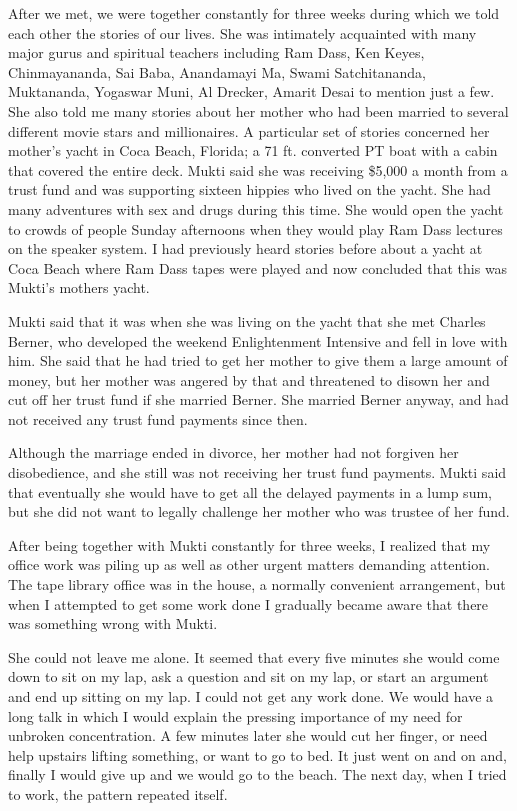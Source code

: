 \documentclass[a5paper,10pt,english]{book}
\begin{document}
\sphinxAtStartPar
After we met, we were together constantly for three weeks during which
we told each other the stories of our lives. She was intimately
acquainted with many major gurus and spiritual teachers including Ram
Dass, Ken Keyes, Chinmayananda, Sai Baba, Anandamayi Ma, Swami
Satchitananda, Muktananda, Yogaswar Muni, Al Drecker, Amarit Desai to
mention just a few. She also told me many stories about her mother who
had been married to several different movie stars and millionaires. A
particular set of stories concerned her mother’s yacht in Coca Beach,
Florida; a 71 ft. converted PT boat with a cabin that covered the entire
deck. Mukti said she was receiving \$5,000 a month from a trust fund and
was supporting sixteen hippies who lived on the yacht. She had many
adventures with sex and drugs during this time. She would open the yacht
to crowds of people Sunday afternoons when they would play Ram Dass
lectures on the speaker system. I had previously heard stories before
about a yacht at Coca Beach where Ram Dass tapes were played and now
concluded that this was Mukti’s mothers yacht.

\sphinxAtStartPar
Mukti said that it was when she was living on the yacht that she met
Charles Berner, who developed the weekend Enlightenment Intensive and
fell in love with him. She said that he had tried to get her mother to
give them a large amount of money, but her mother was angered by that
and threatened to disown her and cut off her trust fund if she married
Berner. She married Berner anyway, and had not received any trust fund
payments since then.

\sphinxAtStartPar
Although the marriage ended in divorce, her mother had not forgiven her
disobedience, and she still was not receiving her trust fund payments.
Mukti said that eventually she would have to get all the delayed
payments in a lump sum, but she did not want to legally challenge her
mother who was trustee of her fund.

\sphinxAtStartPar
After being together with Mukti constantly for three weeks, I realized
that my office work was piling up as well as other urgent matters
demanding attention. The tape library office was in the house, a
normally convenient arrangement, but when I attempted to get some work
done I gradually became aware that there was something wrong with Mukti.

\sphinxAtStartPar
She could not leave me alone. It seemed that every five minutes she
would come down to sit on my lap, ask a question and sit on my lap, or
start an argument and end up sitting on my lap. I could not get any work
done. We would have a long talk in which I would explain the pressing
importance of my need for unbroken concentration. A few minutes later
she would cut her finger, or need help upstairs lifting something, or
want to go to bed. It just went on and on and, finally I would give up
and we would go to the beach. The next day, when I tried to work, the
pattern repeated itself.
\end{document}
